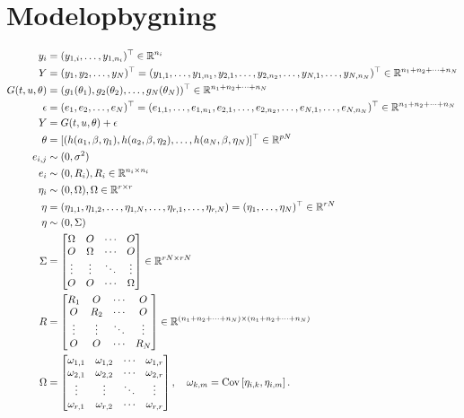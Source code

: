 \section{Modelopbygning}
\begin{align*}
    y_i &= (y_{1,i},\dots,y_{1,n_i})^\top \in \mathbb{R}^{n_i}\\
    Y&=(y_1,y_2,\dots,y_N)^\top= (y_{1,1},\dots,y_{1,n_1},y_{2,1},\dots,y_{2,n_2},\dots,y_{N,1},\dots,y_{N,n_N})^\top \in \mathbb{R}^{n_1+n_2+\cdots+n_N}\\
    G(t,u,\theta)&=(g_1(\theta_1),g_2(\theta_2),\dots,g_N(\theta_N))^\top \in \mathbb{R}^{n_1+n_2+\cdots+n_N}\\
    \epsilon &= (e_1,e_2,\dots,e_N)^\top=(e_{1,1},\dots,e_{1,n_1},e_{2,1},\dots,e_{2,n_2},\dots,e_{N,1},\dots,e_{N,n_N})^\top \in \mathbb{R}^{n_1+n_2+\cdots+n_N}\\
    Y &= G(t,u,\theta) + \epsilon\\
    \theta &= [(h(a_1,\beta,\eta_1),h(a_2,\beta, \eta_2), \dots,h(a_N,\beta,\eta_N)]^\top \in \mathbb{R}^{pN}\\
    e_{i,j} &\sim (0,\sigma^2)\\
    e_i &\sim (0,R_i), R_i \in \mathbb{R}^{n_i \times n_i}\\
    \eta_i &\sim (0,\Omega), \Omega \in \mathbb{R}^{r \times r}\\
    \eta &= (\eta_{1,1},\eta_{1,2},\dots,\eta_{1,N},\dots,\eta_{r,1},\dots,\eta_{r,N})=  (\eta_1,\dots,\eta_N)^\top \in \mathbb{R}^{rN}\\
    \eta &\sim (0,\Sigma)\\
    \Sigma &=
\begin{bmatrix}
    \Omega & O & \cdots & O \\
    O & \Omega & \cdots & O \\
    \vdots & \vdots & \ddots & \vdots \\
    O & O & \cdots &\Omega
\end{bmatrix}
 \in \mathbb{R}^{rN \times rN}\\
     R &=
\begin{bmatrix}
    R_1 & O & \cdots & O \\
    O & R_2 & \cdots & O \\
    \vdots & \vdots & \ddots & \vdots \\
    O & O & \cdots & R_N
\end{bmatrix}
 \in \mathbb{R}^{(n_1+n_2+\dots+n_N)\times (n_1+n_2+\dots+n_N)}\\
 \Omega &= \begin{bmatrix}
    \omega_{1,1} & \omega_{1,2} & \cdots & \omega_{1,r} \\
    \omega_{2,1} & \omega_{2,2} & \cdots & \omega_{2,r} \\
    \vdots & \vdots & \ddots & \vdots \\
    \omega_{r,1} & \omega_{r,2} & \cdots & \omega_{r,r}
\end{bmatrix}, \quad \omega_{k,m} = \text{Cov}\left[{\eta_{i,k},\eta_{i,m}}\right].
\end{align*}

